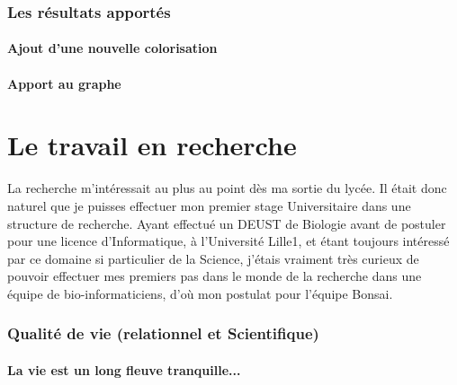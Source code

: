 \documentclass{report}
\begin{document}
\subsection{Les résultats apportés}

\subsubsection{Ajout d'une nouvelle colorisation}

\subsubsection{Apport au graphe}

\chapter{Le travail en recherche}

La recherche m'intéressait au plus au point dès ma sortie du lycée.
\newline
Il était donc naturel que je puisses effectuer mon premier stage Universitaire dans une structure de recherche. Ayant effectué un DEUST de Biologie avant de postuler pour une licence d'Informatique, à l'Université Lille1, et étant toujours intéressé par ce domaine si particulier de la Science, j'étais vraiment très curieux de pouvoir effectuer mes premiers pas dans le monde de la recherche dans une équipe de bio-informaticiens, d'où mon postulat pour l'équipe Bonsai.

\subsection{Qualité de vie (relationnel et Scientifique)}

\subsubsection{La vie est un long fleuve tranquille...}
\end{document}
